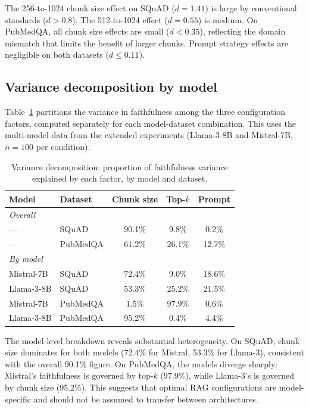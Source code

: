 The 256-to-1024 chunk size effect on SQuAD ($d = 1.41$) is large by
conventional standards ($d > 0.8$). The 512-to-1024 effect ($d = 0.55$)
is medium. On PubMedQA, all chunk size effects are small ($d < 0.35$),
reflecting the domain mismatch that limits the benefit of larger chunks.
Prompt strategy effects are negligible on both datasets ($d \leq 0.11$).

\FloatBarrier
\subsection{Variance decomposition by model}
\label{app:variance_model}

Table~\ref{tab:variance_model} partitions the variance in faithfulness
among the three configuration factors, computed separately for each
model-dataset combination. This uses the multi-model data from the
extended experiments (Llama-3-8B and Mistral-7B, $n = 100$ per condition).

\begin{table}[!htb]
\centering
\caption{Variance decomposition: proportion of faithfulness variance
explained by each factor, by model and dataset.}
\label{tab:variance_model}
\small
\begin{tabular}{llccc}
\toprule
Model & Dataset & Chunk size & Top-$k$ & Prompt \\
\midrule
\multicolumn{2}{l}{\emph{Overall}} \\
--- & SQuAD    & 90.1\% & 9.8\%  & 0.2\% \\
--- & PubMedQA & 61.2\% & 26.1\% & 12.7\% \\
\midrule
\multicolumn{2}{l}{\emph{By model}} \\
Mistral-7B  & SQuAD    & 72.4\% & 9.0\%  & 18.6\% \\
Llama-3-8B  & SQuAD    & 53.3\% & 25.2\% & 21.5\% \\
Mistral-7B  & PubMedQA & 1.5\%  & 97.9\% & 0.6\% \\
Llama-3-8B  & PubMedQA & 95.2\% & 0.4\%  & 4.4\% \\
\bottomrule
\end{tabular}
\end{table}

The model-level breakdown reveals substantial heterogeneity. On SQuAD,
chunk size dominates for both models (72.4\% for Mistral, 53.3\% for
Llama-3), consistent with the overall 90.1\% figure. On PubMedQA, the
models diverge sharply: Mistral's faithfulness is governed by top-$k$
(97.9\%), while Llama-3's is governed by chunk size (95.2\%). This
suggests that optimal RAG configurations are model-specific and should
not be assumed to transfer between architectures.

